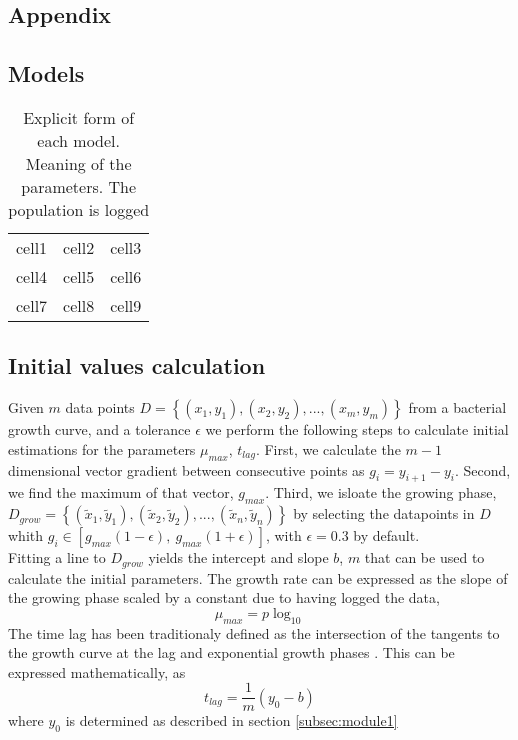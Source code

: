 \documentclass[titlepage,11pt]{article}
\begin{document}
\begin{linenumbers}
	\section{Appendix}
	\subsection{Models}
	\begin{table}[h]
		\centering
		\begin{tabular}{ c c c }
			cell1 & cell2 & cell3 \\ 
			cell4 & cell5 & cell6 \\  
			cell7 & cell8 & cell9    
		\end{tabular}
		\caption{\label{tab:model_eqs}Explicit form of each model. Meaning of the parameters. The population is logged}
	\end{table}
	\subsection{Initial values calculation}\label{subsec:initial_values}
	Given $ m $ data points $ D =  \left\{(x_1, y_1), (x_2, y_2), ... , (x_m, y_m)\right\} $ from a bacterial growth curve, and a tolerance $ \epsilon $ we perform the following steps to calculate initial estimations for the parameters $ \mu_{max} $, $ t_{lag} $. First, we calculate the $ m - 1 $ dimensional vector gradient between consecutive points as $ g_i = y_{i+1} - y_i $. Second, we find the maximum of that vector, $ g_{max} $. Third, we isloate the growing phase, $ D_{grow} = \left\{(\tilde{x}_1, \tilde{y}_1), (\tilde{x}_2, \tilde{y}_2), ... , (\tilde{x}_n, \tilde{y}_n)\right\} $ by selecting the datapoints in $ D $ whith $g_i \in [g_{max}(1-\epsilon), \ g_{max}(1+\epsilon)]$, with $ \epsilon = 0.3 $ by default.\\
	Fitting a line to $ D_{grow} $ yields the intercept and slope $ b $, $ m $ that can be used to calculate the initial parameters. The growth rate can be expressed as the slope of the growing phase scaled by a constant due to having logged the data, 
	\begin{equation}
		\mu_{max}  = p\log_{10}
	\end{equation}
	The time lag has been traditionaly defined as the intersection of the tangents to the growth curve at the lag and exponential growth phases \cite{Micha2011}. This can be expressed mathematically, as 
	\begin{equation}
		t_{lag} = \frac{1}{m}(y_0 - b)
	\end{equation}
	where $ y_0  $ is determined as described in section \ref{subsec:module1}

\end{linenumbers}
\end{document}
